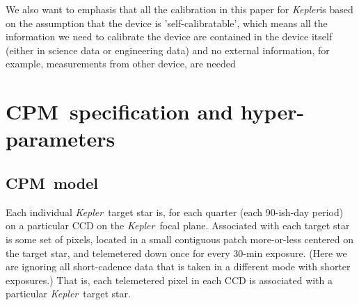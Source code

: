 \documentclass[12pt, preprint]{aastex}
\newcommand{\project}[1]{\textsl{#1}}
\newcommand{\Kepler}{\project{Kepler}}
\newcommand{\name}{CPM}
\begin{document}
We also want to emphasis that all the calibration in this paper for \Kepler is 
  based on the assumption that the device is 'self-calibratable', 
  which means all the information we need to calibrate the device are contained in the device itself 
  (either in science data or engineering data) and no external information, 
  for example, measurements from other device, are needed

\section{\name\ specification and hyper-parameters}
\subsection{\name\ model}
Each individual \Kepler\ target star is, for each quarter (each 90-ish-day period)
  on a particular CCD on the \Kepler\ focal plane.
Associated with each target star is some set of pixels,
  located in a small contiguous patch more-or-less centered on the target star,
  and telemetered down once for every 30-min exposure.
(Here we are ignoring all short-cadence data that is taken in a different mode with shorter exposures.)
That is, each telemetered pixel in each CCD is associated with a particular \Kepler\ target star.
\end{document}
